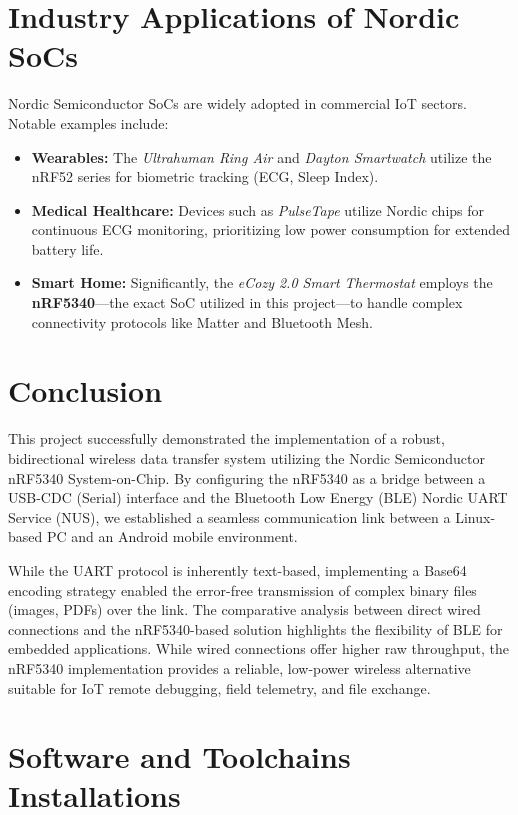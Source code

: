 \documentclass[conference]{IEEEtran}
\begin{document}
\section{Industry Applications of Nordic SoCs}
Nordic Semiconductor SoCs are widely adopted in commercial IoT sectors. Notable examples include:
\begin{itemize}
    \item \textbf{Wearables:} The \textit{Ultrahuman Ring Air} and \textit{Dayton Smartwatch} utilize the nRF52 series for biometric tracking (ECG, Sleep Index).
    \item \textbf{Medical Healthcare:} Devices such as \textit{PulseTape} utilize Nordic chips for continuous ECG monitoring, prioritizing low power consumption for extended battery life.
    \item \textbf{Smart Home:} Significantly, the \textit{eCozy 2.0 Smart Thermostat} employs the \textbf{nRF5340}—the exact SoC utilized in this project—to handle complex connectivity protocols like Matter and Bluetooth Mesh.
\end{itemize}

\section{Conclusion}
This project successfully demonstrated the implementation of a robust, bidirectional wireless data transfer system utilizing the Nordic Semiconductor nRF5340 System-on-Chip. By configuring the nRF5340 as a bridge between a USB-CDC (Serial) interface and the Bluetooth Low Energy (BLE) Nordic UART Service (NUS), we established a seamless communication link between a Linux-based PC and an Android mobile environment.

While the UART protocol is inherently text-based, implementing a Base64 encoding strategy enabled the error-free transmission of complex binary files (images, PDFs) over the link. The comparative analysis between direct wired connections and the nRF5340-based solution highlights the flexibility of BLE for embedded applications. While wired connections offer higher raw throughput, the nRF5340 implementation provides a reliable, low-power wireless alternative suitable for IoT remote debugging, field telemetry, and file exchange.

\appendices
\section{Software and Toolchains Installations}
\end{document}
